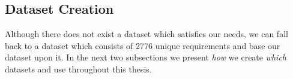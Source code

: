 \subsection{Dataset Creation}
\label{chp:study:sec:study_objects:dataset_creation}

Although there does not exist a dataset which satisfies our needs, we can fall back to a dataset which consists of 2776 unique requirements \parencite{Kummeth:2020} and base our dataset upon it.
In the next two subsections we present \textit{how} we create \textit{which} datasets and use throughout this thesis.





